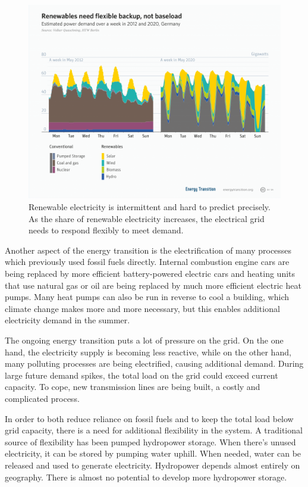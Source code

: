 \begin{figure}
    \centering
    \includegraphics[width = \figurewidth]{figures/flexible_renewables.png}
    \caption{Renewable electricity is intermittent and hard to predict precisely. As the share of renewable electricity increases, the electrical grid needs to respond flexibly to meet demand.}
    \label{fig:flexibility}
\end{figure}


Another aspect of the energy transition is the electrification of many processes which previously used fossil fuels directly.
Internal combustion engine cars are being replaced by more efficient battery-powered electric cars and heating units that use natural gas or oil are being replaced by much more efficient electric heat pumps.
Many heat pumps can also be run in reverse to cool a building, which climate change makes more and more necessary, but this enables additional electricity demand in the summer.

The ongoing energy transition puts a lot of pressure on the grid.
On the one hand, the electricity supply is becoming less reactive, while on the other hand, many polluting processes are being electrified, causing additional demand.
During large future demand spikes, the total load on the grid could exceed current capacity. To cope, new transmission lines are being built, a costly and complicated process.

In order to both reduce reliance on fossil fuels and to keep the total load below grid capacity, there is a need for additional flexibility in the system.
A traditional source of flexibility has been pumped hydropower storage.
When there's unused electricity, it can be stored by pumping water uphill.
When needed, water can be released and used to generate electricity. 
Hydropower depends almost entirely on geography. There is almost no potential to develop more hydropower storage.

